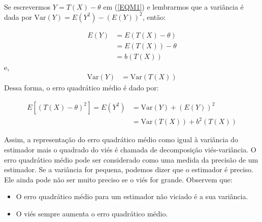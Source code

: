 \documentclass[12pt]{beamer}
\begin{document}
\begin{frame}{}
\begin{block}{}
\justifying
Se escrevermos $Y = T(X) - \theta$ em (\ref{EQM1}) e lembrarmos que a variância é dada por $\text{Var}(Y) = E(Y^2) - (E(Y))^2$, então:

\begin{align*}
E(Y) &= E(T(X) - \theta)\\ 
&= E(T(X)) - \theta\\ 
&= b(T(X))
\end{align*}
e,
\begin{align*}
\text{Var}(Y) &= \text{Var}(T(X))
\end{align*}
Dessa forma, o erro quadrático médio é dado por:

\begin{align*}
E[(T(X) - \theta)^2] = E(Y^2) &= \text{Var}(Y) + (E(Y))^{2}\\
&=\text{Var}(T(X)) + b^2 (T(X))
\end{align*}
\end{block}
\end{frame}

\begin{frame}{}
\begin{block}{}
\justifying
Assim, a representação do erro quadrático médio como igual à variância do estimador mais o quadrado do viés é chamada de decomposição viés-variância. O erro quadrático médio pode ser considerado como uma medida da precisão de um estimador. Se a variância for pequena, podemos dizer que o estimador é preciso. Ele ainda pode não ser muito preciso se o viés for grande. Observem que:
\begin{itemize}
    \item O erro quadrático médio para um estimador não viciado é a sua variância.\pause
    \item O viés sempre aumenta o erro quadrático médio.
\end{itemize}

\end{block}
\end{frame}
\end{document}
